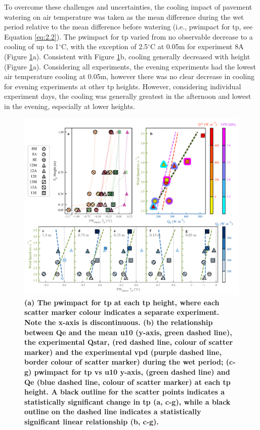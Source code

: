 \documentclass[final,3p,times,authoryear]{elsarticle}
\begin{document}
To overcome these challenges and uncertainties, the cooling impact of pavement
watering on air temperature was taken as the mean difference during the wet period
relative to the mean difference before watering (i.e., \gls{pwimpact} for \gls{tp}, see Equation \ref{eq:2.2}). The \gls{pwimpact} for \gls{tp} varied from no observable decrease to a cooling of up to 1$^{\circ}$C, with the exception of 2.5$^{\circ}$C at 0.05m for experiment 8A (Figure \ref{fig:3.3}a). Consistent with Figure \ref{fig:3.3}b, cooling generally decreased with height (Figure \ref{fig:3.3}a). Considering all experiments, the evening experiments had the lowest air temperature cooling at 0.05m, however there was no clear decrease in cooling for evening experiments at other \gls{tp} heights. However, considering individual experiment days, the cooling was generally greatest in the afternoon and lowest in the evening, especially at lower heights.

\begin{figure}
\centering
\includegraphics[trim={0 0 0 0},clip,scale=1.0]{pict014.png}
\caption{\bf (a) The \gls{pwimpact} for \gls{tp} at each \gls{tp} height, where each scatter marker colour indicates a separate experiment. Note the x-axis is discontinuous. (b) the relationship between \gls{Qe} and the mean \gls{u10} (y-axis, green dashed line), the experimental \gls{Qstar}, (red dashed line, colour of scatter marker) and the experimental \gls{vpd} (purple dashed line, border colour of scatter marker) during the wet period; (c-g) \gls{pwimpact} for \gls{tp} vs \gls{u10} y-axis, (green dashed line) and \gls{Qe} (blue dashed line, colour of scatter marker) at each \gls{tp} height. A black outline for the scatter points indicates a statistically significant change in \gls{tp} (a, c-g), while a black outline on the dashed line indicates a statistically significant linear relationship (b, c-g).}
 \label{fig:3.3}
\end{figure}
\end{document}
